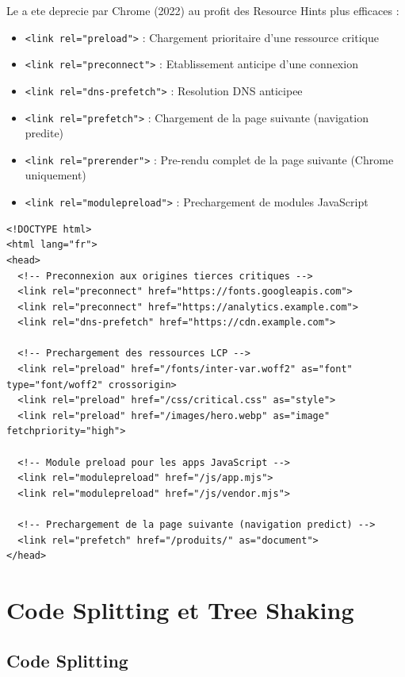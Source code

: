 Le  a ete deprecie par Chrome (2022) au profit des Resource Hints plus efficaces :

\begin{itemize}
    \item \texttt{<link rel="preload">} : Chargement prioritaire d'une ressource critique
    \item \texttt{<link rel="preconnect">} : Etablissement anticipe d'une connexion
    \item \texttt{<link rel="dns-prefetch">} : Resolution DNS anticipee
    \item \texttt{<link rel="prefetch">} : Chargement de la page suivante (navigation predite)
    \item \texttt{<link rel="prerender">} : Pre-rendu complet de la page suivante (Chrome uniquement)
    \item \texttt{<link rel="modulepreload">} : Prechargement de modules JavaScript
\end{itemize}

\begin{lstlisting}[style=htmlcode,caption={Resource Hints stratégiques pour une page optimisée}]
<!DOCTYPE html>
<html lang="fr">
<head>
  <!-- Preconnexion aux origines tierces critiques -->
  <link rel="preconnect" href="https://fonts.googleapis.com">
  <link rel="preconnect" href="https://analytics.example.com">
  <link rel="dns-prefetch" href="https://cdn.example.com">

  <!-- Prechargement des ressources LCP -->
  <link rel="preload" href="/fonts/inter-var.woff2" as="font" type="font/woff2" crossorigin>
  <link rel="preload" href="/css/critical.css" as="style">
  <link rel="preload" href="/images/hero.webp" as="image" fetchpriority="high">

  <!-- Module preload pour les apps JavaScript -->
  <link rel="modulepreload" href="/js/app.mjs">
  <link rel="modulepreload" href="/js/vendor.mjs">

  <!-- Prechargement de la page suivante (navigation predict) -->
  <link rel="prefetch" href="/produits/" as="document">
</head>
\end{lstlisting}

\section{Code Splitting et Tree Shaking}

\subsection{Code Splitting}


